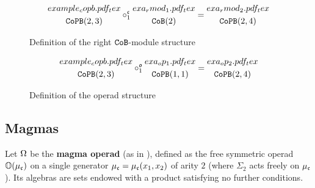 \begin{figure}[htbp]
  \centering
  \[\begin{gathered}
      \def\svgwidth{0.3\textwidth} {example_copb.pdf_tex}
      \\
      \CoPB(2,3)
    \end{gathered}
    \circ_{1}^{\col{c}}
    \begin{gathered}
      \def\svgwidth{0.1\textwidth} {exa_rmod_1.pdf_tex}
      \\
      \CoB(2)
    \end{gathered}
    =
    \begin{gathered}
      \def\svgwidth{0.3\textwidth} {exa_rmod_2.pdf_tex}
      \\
      \CoPB(2,4)
    \end{gathered}
  \]
  \caption{Definition of the right $\mathtt{CoB}$-module structure}
  \label{sw.fig.exa-struct-papb-rmod}
\end{figure}

\begin{figure}[htbp]
  \centering
  \[\begin{gathered}
      \def\svgwidth{0.3\textwidth} {example_copb.pdf_tex}
      \\
      \CoPB(2,3)
    \end{gathered}
    \circ_{1}^{\col{o}}
    \begin{gathered}
      \def\svgwidth{0.1\textwidth} {exa_op_1.pdf_tex} \\
      \CoPB(1,1)
    \end{gathered}
    =
    \begin{gathered}
      \def\svgwidth{0.3\textwidth} {exa_op_2.pdf_tex} \\
      \CoPB(2,4)
    \end{gathered}
  \]
  \caption{Definition of the operad structure}
  \label{sw.fig.exa-struct-papb-op}
\end{figure}


\subsection{Magmas}
\label{sw.sec.magmas}

\begin{definition}
  Let $\Omega$ be the \textbf{magma operad} (as in \cite{Fresse2017}), defined as the free symmetric operad $\mathbb{O}(\mu_{\mathfrak{c}})$ on a single generator $\mu_{\mathfrak{c}} = \mu_{\mathfrak{c}}(x_{1}, x_{2})$ of arity $2$ (where $\Sigma_{2}$ acts freely on $\mu_{\mathfrak{c}}$).
  Its algebras are sets endowed with a product satisfying no further conditions.
\end{definition}

